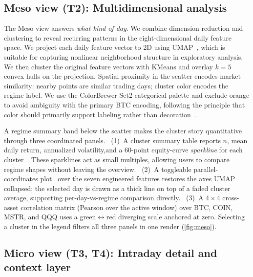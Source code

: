 \documentclass[journal,hideappendix]{vgtc}      %
\begin{document}
\subsection{Meso view (T2): Multidimensional analysis}

The Meso view answers \emph{what kind of day}.  We combine dimension reduction and clustering to reveal recurring patterns in the eight-dimensional daily feature space. 
We project each daily feature vector to 2D using UMAP~\cite{mcinnes2018umap}, which is suitable for capturing nonlinear neighborhood structure in exploratory analysis. We then cluster the original feature vectors with KMeans and overlay \(k=5\) convex hulls on the projection.
Spatial proximity in the scatter encodes market similarity: nearby points are similar trading days; cluster color encodes the regime label.  
We use the ColorBrewer Set2 categorical palette and exclude orange to avoid ambiguity with the primary BTC encoding, following the principle that color should primarily support labeling rather than decoration~\cite{tufte2001}.



A regime summary band below the scatter makes the cluster story
quantitative through three coordinated panels.  
~(1)~A cluster summary table reports $n$, mean daily return, annualized volatility,and a 60-point equity-curve \emph{sparkline} for each
cluster~\cite{tufte2001}. These sparklines act as small multiples, allowing users to compare regime shapes without leaving the overview.  
~(2)~A toggleable parallel-coordinates plot~\cite{inselberg1985} over the seven engineered features restores the axes UMAP collapsed; the selected day is drawn as a thick line on top of a faded cluster average, supporting per-day-vs-regime
comparison directly.
~(3)~A $4{\times}4$ cross-asset correlation matrix (Pearson over the active window) over BTC, COIN, MSTR, and QQQ uses a green$\leftrightarrow$red diverging scale anchored at zero.
Selecting a cluster in the legend filters all three panels in one
render (\cref{fig:meso}).

\subsection{Micro view (T3, T4): Intraday detail and context layer}
\end{document}
